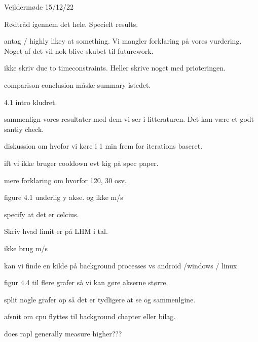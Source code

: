 Vejldermøde 15/12/22

Rødtråd igennem det hele. Specielt results. 

antag / highly likey at something. Vi mangler forklaring på vores vurdering.        Noget af det vil nok blive skubet til futurework.

ikke skriv due to timeconstraints. Heller skrive noget med prioteringen. 

comparison conclusion måske summary istedet. 

4.1 intro kludret. 

sammenlign vores resultater med dem vi ser i litteraturen. Det kan være et godt santiy check. 

diskussion om hvofor vi køre i 1 min frem for iterations baseret. 

ift vi ikke bruger cooldown evt kig på spec paper.

mere forklaring om hvorfor 120, 30 osv.

figure 4.1 underlig y akse. og ikke m/s

specify at det er celcius.

Skriv hvad limit er på LHM i tal.

ikke brug m/s

kan vi finde en kilde på background processes vs android /windows / linux

figur 4.4 til flere grafer så vi kan gøre akserne større.

split nogle grafer op så det er tydligere at se og sammenlgine.

afsnit om cpu flyttes til background chapter eller bilag. 

does rapl generally measure higher???